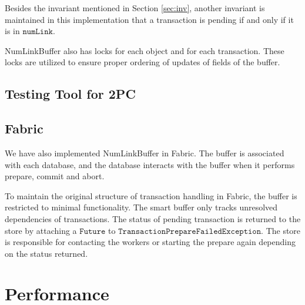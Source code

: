 \documentclass{article}
\begin{document}
Besides the invariant mentioned in Section \ref{sec:inv}, another invariant is 
maintained in this implementation that a transaction is pending if and only if 
it is in $\mathtt{numLink}$.

NumLinkBuffer also has locks for each object and for each transaction. These locks are
utilized to ensure proper ordering of updates of fields of the buffer.



\subsection{Testing Tool for 2PC}

\subsection{Fabric}
We have also implemented NumLinkBuffer in Fabric. The buffer is associated with
each database, and the database interacts with the buffer when it performs prepare,
commit and abort.

To maintain the original structure of transaction handling in Fabric, the buffer
is restricted to minimal functionality. The smart buffer only tracks unresolved
dependencies of transactions. The status of pending transaction is returned to
the store by attaching a $\mathtt{Future}$ to
$\mathtt{TransactionPrepareFailedException}$. The store is responsible for
contacting the workers or starting the prepare again depending on the status
returned.

\section{Performance}
\label{sec:performance}
\end{document}
